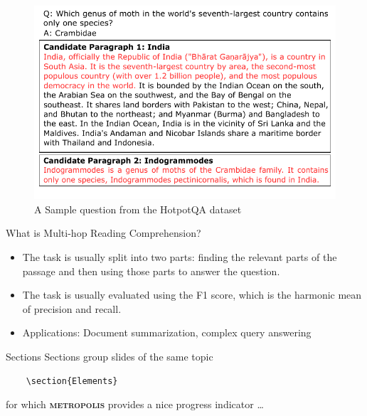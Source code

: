 \documentclass[10pt]{beamer}
\newcommand{\themename}{\textbf{\textsc{metropolis}}\xspace}
\begin{document}
\begin{frame}
  \begin{figure}[t] %
    \centering
    \includegraphics[width=\linewidth]{fig/fig_1_hotpot_example.pdf} %
    \caption{A Sample question from the HotpotQA dataset}
    \label{fig:sample_hotpotqa} %
  \end{figure}
\end{frame}

\begin{frame}[fragile]{What is Multi-hop Reading Comprehension?}

  \begin{itemize}
    \item The task is usually split into two parts: finding the relevant parts of the passage and then using those parts to answer the question.
    \item The task is usually evaluated using the F1 score, which is the harmonic mean of precision and recall.
    \item Applications: Document summarization, complex query answering
    
  \end{itemize}
\end{frame}


\begin{frame}[fragile]{Sections}
  Sections group slides of the same topic

  \begin{verbatim}    \section{Elements}\end{verbatim}

  for which \themename provides a nice progress indicator \ldots
  
\end{frame}
\end{document}
